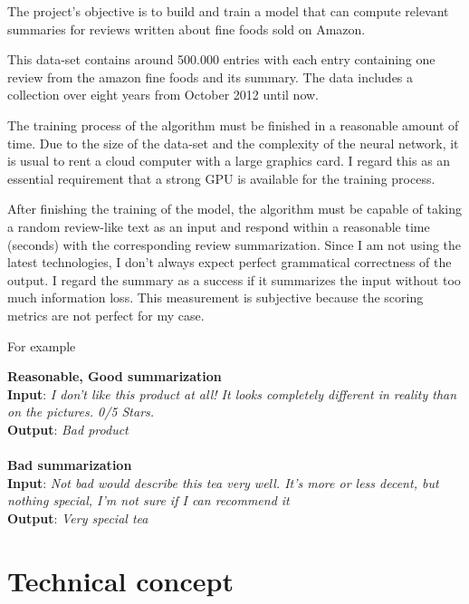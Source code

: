 The project's objective is to build and train a model that can compute relevant summaries for reviews written about fine foods sold on Amazon. 

This data-set contains around 500.000 entries with each entry containing one review from the amazon fine foods and its summary. The data includes a collection over eight years from October 2012 until now. 

The training process of the algorithm must be finished in a reasonable amount of time. Due to the size of the data-set and the complexity of the neural network, it is usual to rent a cloud computer with a large graphics card. I regard this as an essential requirement that a strong GPU is available for the training process. 

After finishing the training of the model, the algorithm must be capable of taking a random review-like text as an input and respond within a reasonable time (seconds) with the corresponding review summarization. Since I am not using the latest technologies, I don't always expect perfect grammatical correctness of the output. I regard the summary as a success if it summarizes the input without too much information loss. This measurement is subjective because the scoring metrics are not perfect for my case.

For example

\begin{tcolorbox}
	\textbf{Reasonable, Good summarization} \\
	
		\textbf{Input}:
			\textit{I don't like this product at all! It looks completely different in reality than on the pictures. 0/5 Stars.} \\
			
		\textbf{Output}:
			\textit{Bad product} \\ \\
		
	\textbf{Bad summarization} \\
	
		\textbf{Input}:
		\textit{Not bad would describe this tea very well. It's more or less decent, but nothing special, I'm not sure if I can recommend it} \\
		
		\textbf{Output}:
		\textit{Very special tea}
	
\end{tcolorbox}



\section{Technical concept}\label{ss:tc}

